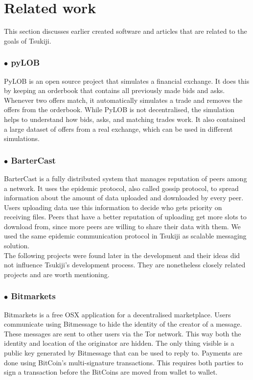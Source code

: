\section{Related work}
This section discusses earlier created software and articles that are related to the goals of Tsukiji.

\subsubsection*{$\bullet$ pyLOB}
PyLOB \cite{pyLOB} is an open source project that simulates a financial exchange.
It does this by keeping an orderbook that contains all previously made bids and asks.
Whenever two offers match, it automatically simulates a trade and removes the offers from the orderbook.
While PyLOB is not decentralised, the simulation helps to understand how bids, asks, and matching trades work.
It also contained a large dataset of offers from a real exchange, which can be used in different simulations.

\subsubsection*{$\bullet$ BarterCast}
BarterCast \cite{bartercast} is a fully distributed system that manages reputation of peers among a network. 
It uses the epidemic protocol, also called gossip protocol, to spread information about the amount of data uploaded and downloaded by every peer.
Users uploading data use this information to decide who gets priority on receiving files.
Peers that have a better reputation of uploading get more slots to download from, since more peers are willing to share their data with them.
We used the same epidemic communication protocol in Tsukiji as scalable messaging solution.\\

The following projects were found later in the development and their ideas did not influence Tsukiji's development process.
They are nonetheless closely related projects and are worth mentioning.

\subsubsection*{$\bullet$ Bitmarkets}
Bitmarkets\cite{bitmarkets} is a free OSX application for a decentralised marketplace.
Users communicate using Bitmessage \cite{bitmessage} to hide the identity of the creator of a message.
These messages are sent to other users via the Tor \cite{tor} network.
This way both the identity and location of the originator are hidden.
The only thing visible is a public key generated by Bitmessage that can be used to reply to.
Payments are done using BitCoin's multi-signature transactions.
This requires both parties to sign a transaction before the BitCoins are moved from wallet to wallet.

